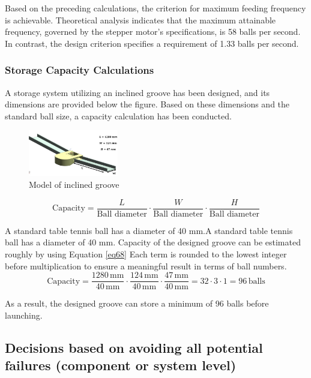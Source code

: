 \documentclass[12pt]{article}
\begin{document}
Based on the preceding calculations, the criterion for maximum feeding frequency is achievable. Theoretical analysis indicates that the maximum attainable frequency, governed by the stepper motor's specifications, is 58 balls per second. In contrast, the design criterion specifies a requirement of 1.33 balls per second. 

\subsubsection{Storage Capacity Calculations}

A storage system utilizing an inclined groove has been designed, and its dimensions are provided below the figure. Based on these dimensions and the standard ball size, a capacity calculation has been conducted.

\begin{figure}[h!]
    \centering
    \includegraphics[width=0.35\textwidth]{Figures/storage capacity.png} 
    \caption{Model of inclined groove}
    \label{fig:storage} 
\end{figure}

\begin{equation}
\label{eq68}
\text{Capacity} = \frac{L}{\text{Ball diameter}} \cdot \frac{W}{\text{Ball diameter}} \cdot \frac{H}{\text{Ball diameter}}
\end{equation}

A standard table tennis ball has a diameter of 40 mm.A standard table tennis ball has a diameter of 40 mm. Capacity of the designed groove can be estimated roughly by using Equation \ref{eq68}
Each term is rounded to the lowest integer before multiplication to ensure a meaningful result in terms of ball numbers.
\begin{equation}
\text{Capacity} = \frac{1280 \, \text{mm}}{40 \, \text{mm}} \cdot \frac{124 \, \text{mm}}{40 \, \text{mm}} \cdot \frac{47 \, \text{mm}}{40 \, \text{mm}} = 32 \cdot 3 \cdot 1 = 96 \, \text{balls}
\end{equation}

As a result, the designed groove can store a minimum of 96 balls before launching.

\subsection{Decisions based on avoiding all potential failures (component or system level)}
\end{document}
